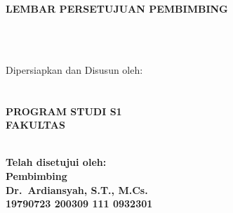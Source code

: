 
\newpage
{}
\begin{center}
    \begin{doublespace}
        \textbf{\large{\MakeUppercase{lembar persetujuan pembimbing}}}\\[0.5cm]
        \textbf{\large{\MakeUppercase{\tipe}}}\\[2cm]
    \end{doublespace}
    
    \begin{doublespace}
        \textbf{\large{\MakeUppercase{\judulid}}}\\[2cm]
    \end{doublespace}
    Dipersiapkan dan Disusun oleh:\\[0.5cm]
    \textbf{\penulis}\\
    \textbf{\nim}\\[2cm]

    \textbf{\large{\MakeUppercase{PROGRAM STUDI S1 \prodi}}}\\
    \textbf{\large{\MakeUppercase{FAKULTAS \fakultas}}}\\
    \textbf{\large{\MakeUppercase{\universitas}}}\\

    \vfill

    \textbf{Telah disetujui oleh:}\\[0.5cm]
    \textbf{Pembimbing}\\[2cm]
    \textbf{Dr.\ Ardiansyah, S.T., M.Cs.}\\[0.5cm]
    \textbf{19790723 200309 111 0932301}
\end{center}

